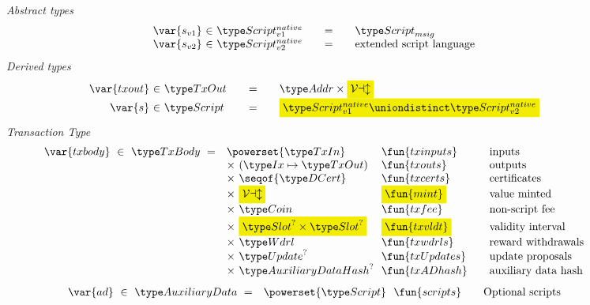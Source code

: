 \begin{figure*}[t!]
  \emph{Abstract types}
  \begin{equation*}
    \begin{array}{r@{~\in~}l@{\qquad=\qquad}lr}
      \var{s_{v1}} & \ScriptNI & \ScriptMSig \\
      \var{s_{v2}} & \Timelock & \text{extended script language}
    \end{array}
  \end{equation*}
  \emph{Derived types}
  \begin{equation*}
    \begin{array}{r@{~\in~}l@{\qquad=\qquad}lr}
      \var{txout} & \TxOut & \Addr \times \hldiff{\ValClass} \\
      \var{s} & \Script & \hldiff{\ScriptNI \uniondistinct \Timelock}
      \\
    \end{array}
  \end{equation*}
  \emph{Transaction Type}
  \begin{equation*}
    \begin{array}{r@{~~}l@{~~}l@{\qquad}l}
      \var{txbody} ~\in~ \TxBody ~=~
      & \powerset{\TxIn} & \fun{txinputs}& \text{inputs}\\
      &\times ~(\Ix \mapsto \TxOut) & \fun{txouts}& \text{outputs}\\
      & \times~ \seqof{\DCert} & \fun{txcerts}& \text{certificates}\\
       & \times ~\hldiff{\ValClass}  & \hldiff{\fun{mint}} &\text{value minted}\\
       & \times ~\Coin & \fun{txfee} &\text{non-script fee}\\
       & \times ~\hldiff{\Slot^? \times \Slot^?} & \hldiff{\fun{txvldt}} & \text{validity interval}\\
       & \times~ \Wdrl  & \fun{txwdrls} &\text{reward withdrawals}\\
       & \times ~\Update^?  & \fun{txUpdates} & \text{update proposals}\\
       & \times ~\AuxiliaryDataHash^? & \fun{txADhash} & \text{auxiliary data hash}
    \end{array}
  \end{equation*}
  \begin{equation*}
    \begin{array}{r@{~~}l@{~~}l@{\qquad}l}
      \var{ad} ~\in~ \AuxiliaryData ~=~
      & \powerset{\Script} & \fun{scripts}& \text{Optional scripts}\\

\end{array}
\end{equation*}
\end{figure*}
